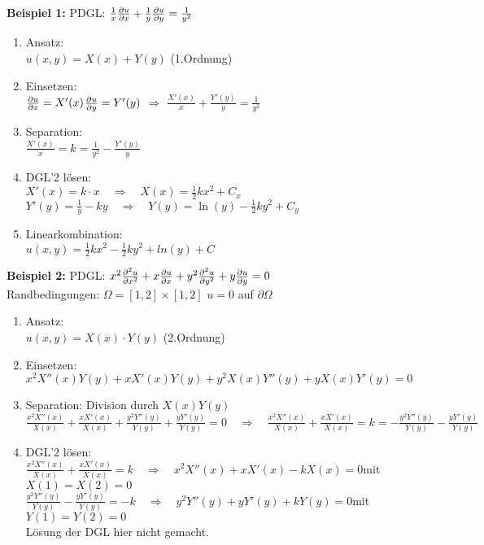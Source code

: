 \begin{minipage}{0.49\textwidth}
\textbf{Beispiel 1: } PDGL: $\frac1x\frac{\partial u}{\partial x}+\frac1y\frac{\partial u}{\partial y}=\frac{1}{y^2}$
\begin{enumerate}
	\item Ansatz:\\[0.4cm]
	$u(x,y)=X(x) + Y(y)$ (1.Ordnung)
	\item Einsetzen:\\[0.4cm]
	$\frac{\partial u}{\partial x}=X'(x)$\qquad $\frac{\partial u}{\partial y}=Y'(y)$ \quad $\Rightarrow$ \quad $\frac{X'(x)}{x}+\frac{Y'(y)}{y}=\frac{1}{y^2}$
	\item Separation:\\[0.4cm]
	$\frac{X'(x)}{x}=k=\frac{1}{y^2}-\frac{Y'(y)}{y}$
	\item DGL'2 lösen:\\[0.4cm]
	$X'(x)=k\cdot x \quad\Rightarrow\quad X(x)=\frac12 kx^2+C_x$\\
	$Y'(y)=\frac1y-ky \quad\Rightarrow\quad Y(y)=\ln(y)-\frac12 ky^2+C_y$
	\item Linearkombination:\\[0.4cm]
	$u(x,y)=\frac12 kx^2 - \frac12 ky^2+ln(y)+C$
\end{enumerate}

\textbf{Beispiel 2: } PDGL: $x^2\frac{\partial ^2u}{\partial x^2}+x\frac{\partial u}{\partial x}+y^2\frac{\partial ^2u}{\partial y^2}+y\frac{\partial u}{\partial y}=0$\\ 
Randbedingungen: $\Omega=[1,2]\times[1,2]$ \qquad $u=0$ auf $\partial\Omega$
\begin{enumerate}
	\item Ansatz:\\[0.4cm]
	$u(x,y)=X(x) \cdot Y(y)$ (2.Ordnung)
	\item Einsetzen:\\[0.4cm]
	$x^2X''(x)Y(y)+xX'(x)Y(y)+y^2X(x)Y''(y)+yX(x)Y'(y)=0$
	\item Separation: Division durch $X(x)Y(y)$\\[0.4cm]
	$\frac{x^2X''(x)}{X(x)}+\frac{xX'(x)}{X(x)}+\frac{y^2Y''(y)}{Y(y)}+\frac{yY'(y)}{Y(y)}=0\quad\Rightarrow\quad \frac{x^2X''(x)}{X(x)}+\frac{xX'(x)}{X(x)}=k=-\frac{y^2Y''(y)}{Y(y)}-\frac{yY'(y)}{Y(y)}$
	\item DGL'2 lösen:\\[0.4cm]
	$\frac{x^2X''(x)}{X(x)}+\frac{xX'(x)}{X(x)}=k\quad\Rightarrow\quad x^2X''(x)+xX'(x)-kX(x)=0$\qquad mit $X(1)=X(2)=0$\\
	$\frac{y^2Y''(y)}{Y(y)}-\frac{yY'(y)}{Y(y)}=-k\quad\Rightarrow\quad y^2Y''(y)+yY'(y)+kY(y)=0$\qquad mit $Y(1)=Y(2)=0$\\[0.4cm]
	Lösung der DGL hier nicht gemacht.
\end{enumerate}
\end{minipage}
